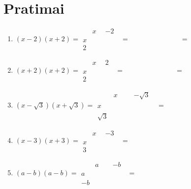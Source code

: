 \documentclass{article}
\def\ph#1{\phantom{#1}}
\begin{document}
\section*{Pratimai}

\begin{minipage}[b]{0.4\linewidth}
\begin{enumerate}
    \item $(x-2)(x+2) = 
    \begin{array}{c||c|c}
     & x & -2 \\
     \hline
     x & \ph{x^2} & \ph{-2x} \\
     \hline
     2 & \ph{2x} & \ph{-4}
     \end{array} = 
     \ph{x^2-2x+2x-4}=\ph{x^2-4}$
     
     \item $(x+2)(x+2) = 
    \begin{array}{c||c|c}
     & x & 2 \\
     \hline
     x & \ph{x^2} & \ph{2x} \\
     \hline
     2 & \ph{2x} & \ph{4}
     \end{array} = 
     \ph{x^2+2x+2x+4}=\ph{x^2+4x+4}$
     
     \item $(x-\sqrt{3})(x+\sqrt{3}) = 
    \begin{array}{c||c|c}
     & x & -\sqrt{3} \\
     \hline
     x & \ph{x^2} & \ph{-x\sqrt{3}} \\
     \hline
     \sqrt{3} & \ph{x\sqrt{3}} & \ph{-3}
     \end{array} = 
     \ph{x^2 - 3}$
     
     \item $(x-3)(x+3) = 
    \begin{array}{c||c|c}
     & x & -3 \\
     \hline
     x & \ph{x^2} & \ph{-3x} \\
     \hline
     3 & \ph{3x} & \ph{-9} 
     \end{array} = 
     \ph{x^2-9}$
     
     \item $(a-b)(a-b) = 
    \begin{array}{c||c|c}
     & a & -b \\
     \hline
     a & \ph{a^2} & \ph{-ab} \\
     \hline
     -b & \ph{-ab} & \ph{b^2}
     \end{array} = 
     \ph{a^2-2ab+b^2}$
     \end{enumerate}
     \end{minipage}
\end{document}
